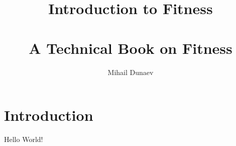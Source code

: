 \documentclass[openany]{book}
\title{
  Introduction to Fitness \\
  \hfill \\
  \small A Technical Book on Fitness}
\author{Mihail Dunaev}
\date{}
\begin{document}
  \maketitle
  \tableofcontents
  \chapter{Introduction}
  Hello World!
\end{document}
